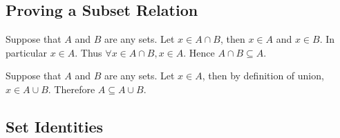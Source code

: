 \documentclass{report}
\begin{document}
\subsection{Proving a Subset Relation}
\begin{myproof}
    Suppose that $A$ and $B$ are any sets. Let $x\in A\cap B$, then $x\in A$ and $x\in B$. In particular $x\in A$. Thus $\forall x\in A\cap B, x\in A$. Hence $A\cap B\subseteq A$.
\end{myproof}
\begin{myproof}
    Suppose that $A$ and $B$ are any sets. Let $x\in A$, then by definition of union, $x\in A\cup B$. Therefore $A\subseteq A\cup B$.
\end{myproof}

\subsection{Set Identities}
\end{document}
